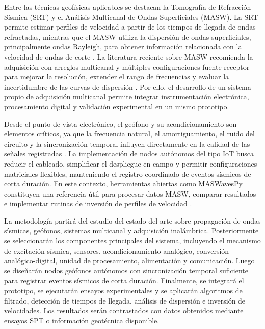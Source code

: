 \documentclass[11pt,a4paper]{article}
\begin{document}
	Entre las t\'ecnicas geof\'isicas aplicables se destacan la Tomograf\'ia de Refracci\'on S\'ismica (SRT) y el An\'alisis Multicanal de Ondas Superficiales (MASW). La SRT permite estimar perfiles de velocidad a partir de los tiempos de llegada de ondas refractadas, mientras que el MASW utiliza la dispersi\'on de ondas superficiales, principalmente ondas Rayleigh, para obtener informaci\'on relacionada con la velocidad de ondas de corte \cite{Park1999,Xia1999,Foti2014}. La literatura reciente sobre MASW recomienda la adquisici\'on con arreglos multicanal y m\'ultiples configuraciones fuente-receptor para mejorar la resoluci\'on, extender el rango de frecuencias y evaluar la incertidumbre de las curvas de dispersi\'on \cite{Foti2018,OlafsdottirNGM2024}. Por ello, el desarrollo de un sistema propio de adquisici\'on multicanal permite integrar instrumentaci\'on electr\'onica, procesamiento digital y validaci\'on experimental en un mismo prototipo.
	
	Desde el punto de vista electr\'onico, el ge\'ofono y su acondicionamiento son elementos cr\'iticos, ya que la frecuencia natural, el amortiguamiento, el ruido del circuito y la sincronizaci\'on temporal influyen directamente en la calidad de las se\~nales registradas \cite{Ma2023,Olafsdottir2018}. La implementaci\'on de nodos aut\'onomos del tipo IoT busca reducir el cableado, simplificar el despliegue en campo y permitir configuraciones matriciales flexibles, manteniendo el registro coordinado de eventos s\'ismicos de corta duraci\'on. En este contexto, herramientas abiertas como MASWavesPy constituyen una referencia \'util para procesar datos MASW, comparar resultados e implementar rutinas de inversi\'on de perfiles de velocidad \cite{Olafsdottir2020,OlafsdottirNGM2024}.
	
	La metodolog\'ia partir\'a del estudio del estado del arte sobre propagaci\'on de ondas s\'ismicas, ge\'ofonos, sistemas multicanal y adquisici\'on inal\'ambrica. Posteriormente se seleccionar\'an los componentes principales del sistema, incluyendo el mecanismo de excitaci\'on s\'ismica, sensores, acondicionamiento anal\'ogico, conversi\'on anal\'ogico-digital, unidad de procesamiento, alimentaci\'on y comunicaci\'on. Luego se dise\~nar\'an nodos ge\'ofonos aut\'onomos con sincronizaci\'on temporal suficiente para registrar eventos s\'ismicos de corta duraci\'on. Finalmente, se integrar\'a el prototipo, se ejecutar\'an ensayos experimentales y se aplicar\'an algoritmos de filtrado, detecci\'on de tiempos de llegada, an\'alisis de dispersi\'on e inversi\'on de velocidades. Los resultados ser\'an contrastados con datos obtenidos mediante ensayos SPT o informaci\'on geot\'ecnica disponible.
	
\end{document}

